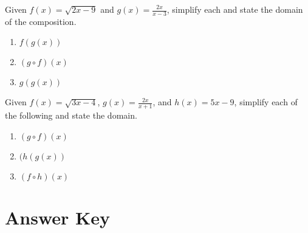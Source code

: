 Given $f(x) = \sqrt{2x-9}$ and $g(x) = \frac{2x}{x-3}$, simplify each and state the domain of the composition.

\begin{multicols}{3}
\begin{enumerate}	\setcounter{enumi}{\value{Review}}  
    \item $f(g(x))$
    \item $(g \circ f)(x)$
    \item $g(g(x))$
\end{enumerate}		\setcounter{Review}{\value{enumi}}
\end{multicols}

Given $f(x) = \sqrt{3x-4}$, $g(x) = \frac{2x}{x+1}$, and $h(x) = 5x-9$, simplify each of the following and state the domain.
\begin{multicols}{3}
\begin{enumerate}   \setcounter{enumi}{\value{Review}}
    \item $(g \circ f)(x)$
    \item $(h(g(x))$
    \item $(f \circ h)(x)$
\end{enumerate}     \setcounter{Review}{\value{enumi}}
\end{multicols}

\newpage

\section{Answer Key}


